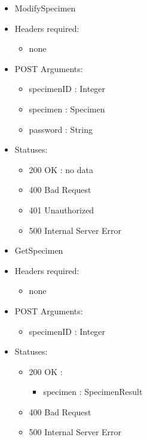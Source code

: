 \begin{itemize}
        \item ModifySpecimen
        \item Headers required:
        \begin{itemize}
        	\item none
        \end{itemize}
        \item POST Arguments:
        \begin{itemize}
        	\item specimenID : Integer
        	\item specimen : Specimen
        	\item password : String
        \end{itemize}
        \item Statuses:
        \begin{itemize}
        	\item 200 OK : no data
        	\item 400 Bad Request
        	\item 401 Unauthorized
        	\item 500 Internal Server Error
        \end{itemize}


        \item GetSpecimen
        \item Headers required: 
        \begin{itemize}
            \item none
        \end{itemize}
        \item POST Arguments:
        \begin{itemize}
        	\item specimenID : Integer
        \end{itemize}
        \item Statuses:
        \begin{itemize}
        	\item 200 OK :
            \begin{itemize}
                \item specimen : SpecimenResult
            \end{itemize}
        	\item 400 Bad Request
        	\item 500 Internal Server Error
        \end{itemize}


\end{itemize}
